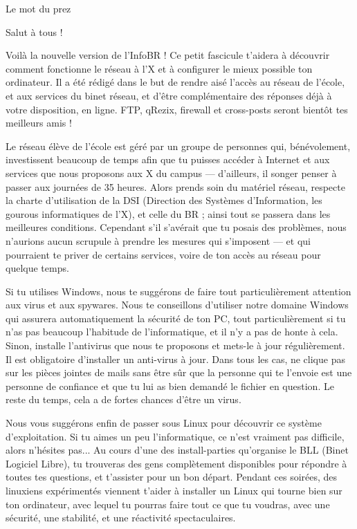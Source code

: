 \begin{center} {
	\LARGE Le mot du prez
} \end{center}

Salut \`a tous !

Voil\`a la nouvelle version de l'InfoBR !
Ce petit fascicule t'aidera \`a d\'ecouvrir comment fonctionne le r\'eseau \`a l'X
et \`a configurer le mieux possible ton ordinateur.
Il a \'et\'e r\'edig\'e dans le but de rendre ais\'e l'acc\`es au r\'eseau de l'\'ecole,
et aux services du binet r\'eseau, et d'\^etre compl\'ementaire des r\'eponses d\'ej\`a \`a votre disposition, en ligne.
FTP, qRezix, firewall et cross-posts seront bient\^ot tes meilleurs amis !

Le r\'eseau \'el\`eve de l'\'ecole est g\'er\'e par un groupe de personnes qui, b\'en\'evolement,
investissent beaucoup de temps afin que tu puisses acc\'eder \`a Internet
et aux services que nous proposons aux X du campus
--- d'ailleurs, il songer penser \`a passer aux journ\'ees de 35 heures.
Alors prends soin du mat\'eriel r\'eseau, respecte la charte d'utilisation de la DSI
(Direction des Syst\`emes d'Information, les gourous informatiques de l'X), et celle du BR ;
ainsi tout se passera dans les meilleures conditions.
Cependant s'il s'av\'erait que tu posais des probl\`emes,
nous n'aurions aucun scrupule \`a prendre les mesures qui s'imposent
--- et qui pourraient te priver de certains services, voire de ton acc\`es au r\'eseau pour quelque temps.

Si tu utilises Windows, nous te sugg\'erons de faire tout particuli\`erement attention aux virus et aux spywares.
Nous te conseillons d'utiliser notre domaine Windows qui assurera automatiquement la s\'ecurit\'e de ton PC,
tout particuli\`erement si tu n'as pas beaucoup l'habitude de l'informatique, et il n'y a pas de honte \`a cela.
Sinon, installe l'antivirus que nous te proposons et mets-le \`a jour r\'eguli\`erement.
Il est obligatoire d'installer un anti-virus \`a jour.
Dans tous les cas, ne clique pas sur les pi\`eces jointes de mails sans \^etre s\^ur que la personne qui te l'envoie
est une personne de confiance et que tu lui as bien demand\'e le fichier en question.
Le reste du temps, cela a de fortes chances d'\^etre un virus.

Nous vous sugg\'erons enfin de passer sous Linux pour d\'ecouvrir ce syst\`eme d'exploitation.
Si tu aimes un peu l'informatique, ce n'est vraiment pas difficile, alors n'h\'esites pas...
Au cours d'une des install-parties qu'organise le BLL (Binet Logiciel Libre),
tu trouveras des gens compl\`etement disponibles pour r\'epondre \`a toutes tes questions,
et t'assister pour un bon d\'epart.
Pendant ces soir\'ees, des linuxiens exp\'eriment\'es viennent t'aider
\`a installer un Linux qui tourne bien sur ton ordinateur,
avec lequel tu pourras faire tout ce que tu voudras,
avec une s\'ecurit\'e, une stabilit\'e, et une r\'eactivit\'e spectaculaires.

